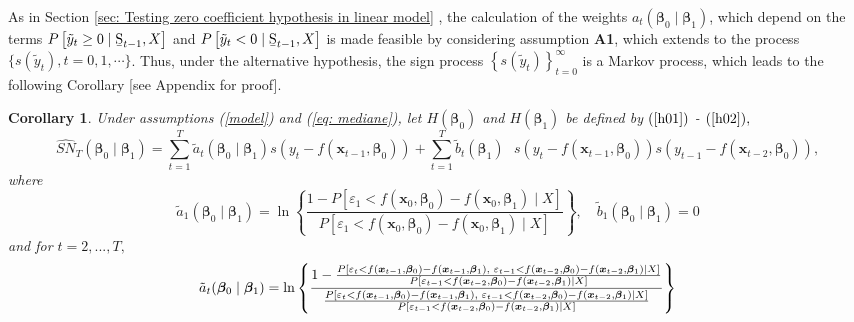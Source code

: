 \documentclass[harvard,11pt]{article}
\newtheorem{corollary}{Corollary}
\begin{document}
As in Section \ref{sec: Testing zero coefficient hypothesis in linear model}%
, the calculation of the weights $a_{t}(\bm{\beta}_{0}\mid\bm{\beta}_{1})$, which depend on the terms $P\left[ \tilde{y}_{t}\geq 0\mid \text{\b{S%
}}_{t-1},X\right] $ and $P\left[ \tilde{y}_{t}<0\mid \text{\b{S}}%
_{t-1},X\right] $ is made feasible by considering assumption \textbf{A1}, which extends to the process $\{s(\tilde{y}_t),t=0,1,\cdots\}$. Thus, under the alternative hypothesis, the sign process $\left\{
s(\tilde{y}_{t})\right\} _{t=0}^{\infty }$ is a Markov process, which leads to the following Corollary [see Appendix for proof]. 
\begin{corollary}
\label{Corollary2} Under assumptions (\ref{model}) and  (\ref{eq: mediane}),
let $H(\bm{\beta}_{0})$ and $H(\bm{\beta}_{1})$ be defined by $(\ref{h01})$ - $(\ref%
{h02}),$%
\begin{equation*}
\widehat{SN}_{T}(\bm{\beta}_{0}\mid\bm{\beta}_{1})=\sum\limits_{t=1}^{T}\tilde{a}%
_{t}(\bm{\beta}_{0}\mid\bm{\beta}_{1})s(y_{t}-f(\bm{x}_{t-1},\bm{\beta}_{0}))+\sum\limits_{t=1}^{T}\tilde{b}_{t}(\bm{\beta}_{1})\text{ }%
s(y_{t}-f(\bm{x}_{t-1},\bm{\beta}_{0}))s(y_{t-1}-f(\bm{x}_{t-2},\bm{\beta}_{0})),
\end{equation*}%
where%
\begin{equation*}
\tilde{a}_{1}(\bm{\beta}_{0}\mid\bm{\beta}_{1})=\ln \left\{ \frac{1-P\left[
\varepsilon_{1}<f(\bm{x}_{0},\bm{\beta}_{0})-f(\bm{x}_{0},\bm{\beta}_{1})\mid X\right] }{P\left[
\varepsilon_{1}<f(\bm{x}_{0},\bm{\beta} _{0})-f(\bm{x}_{0},\bm{\beta}_{1})\mid X\right] }\right\} ,\quad%
\tilde{b}_{1}(\bm{\beta}_{0}\mid\bm{\beta}_{1})=0
\end{equation*}%
and for $t=2,...,T,$%
\begin{equation*}
\tilde{a}_{t}(\bm{\beta}_{0}\mid\bm{\beta}_{1})=\ln \left\{ \frac{1-\frac{P%
\left[ \varepsilon_{t}<f(\bm{x}_{t-1},\bm{\beta}_{0})-f(\bm{x}_{t-1},\bm{\beta}_{1}),\text{ }%
\varepsilon_{t-1}<f(\bm{x}_{t-2},\bm{\beta}_{0})-f(\bm{x}_{t-2},\bm{\beta}_{1})\mid X\right] }{P%
\left[ \varepsilon_{t-1}<f(\bm{x}_{t-2},\bm{\beta}_{0})-f(\bm{x}_{t-2},\bm{\beta}_{1})\mid X\right] }}{\frac{%
P\left[ \varepsilon_{t}<f(\bm{x}_{t-1},\bm{\beta}_{0})-f(\bm{x}_{t-1},\bm{\beta}_{1}),\text{ }%
\varepsilon_{t-1}<f(\bm{x}_{t-2},\bm{\beta}_{0})-f(\bm{x}_{t-2},\bm{\beta}_{1})\mid X\right] }{P%
\left[ \varepsilon_{t-1}<f(\bm{x}_{t-2},\bm{\beta}_{0})-f(\bm{x}_{t-2},\bm{\beta}_{1})\mid X\right] }}\right\} 
\end{equation*}
\begin{equation*}

\end{equation*}
\end{corollary}
\end{document}
